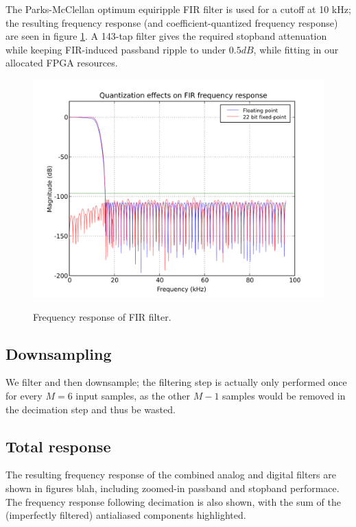 The Parks-McClellan optimum equiripple FIR filter is used for a cutoff at 10 kHz; the resulting frequency response (and coefficient-quantized frequency response) are seen in figure \ref{FIR}. A 143-tap filter gives the required stopband attenuation while keeping FIR-induced passband ripple to under $0.5 dB$, while fitting in our allocated FPGA resources. 

\begin{figure}[h!]
\includegraphics[scale=1.0]{soma-1.digital.quant.svg}
\label{FIR}
\caption{Frequency response of FIR filter.}
\end{figure}  

\subsection{Downsampling}
We filter and then downsample; the filtering step is actually only performed once for every $M=6$ input samples, as the other $M-1$ samples would be removed in the decimation step and thus be wasted. 

\subsection{Total response}
The resulting frequency response of the combined analog and digital filters are shown in figures blah, including zoomed-in passband and stopband performace. The frequency response following decimation is also shown, with the sum of the (imperfectly filtered) antialiased components highlighted. 

